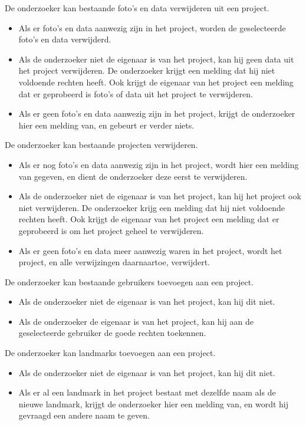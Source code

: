 De onderzoeker kan bestaande foto's en data verwijderen uit een project.
\begin{itemize}
	\item Als er foto's en data aanwezig zijn in het project, worden de geselecteerde foto's en data verwijderd.
	\item Als de onderzoeker niet de eigenaar is van het project, kan hij geen data uit het project verwijderen. De onderzoeker krijgt een melding dat hij niet voldoende rechten heeft. Ook krijgt de eigenaar van het project een melding dat er geprobeerd is foto's of data uit het project te verwijderen.	
	\item Als er geen foto's en data aanwezig zijn in het project, krijgt de onderzoeker hier een melding van, en gebeurt er verder niets.
\end{itemize}

De onderzoeker kan bestaande projecten verwijderen.
\begin{itemize}
	\item Als er nog foto's en data aanwezig zijn in het project, wordt hier een melding van gegeven, en dient de onderzoeker deze eerst te verwijderen.
	\item Als de onderzoeker niet de eigenaar is van het project, kan hij het project ook niet verwijderen. De onderzoeker krijg een melding dat hij niet voldoende rechten heeft. Ook krijgt de eigenaar van het project een melding dat er geprobeerd is om het project geheel te verwijderen.
	\item Als er geen foto's en data meer aanwezig waren in het project, wordt het project, en alle verwijzingen daarnaartoe, verwijdert.
\end{itemize}

De onderzoeker kan bestaande gebruikers toevoegen aan een project.
\begin{itemize}
	\item Als de onderzoeker niet de eigenaar is van het project, kan hij dit niet.
	\item Als de onderzoeker de eigenaar is van het project, kan hij aan de geselecteerde gebruiker de goede rechten toekennen.
\end{itemize}

De onderzoeker kan landmarks toevoegen aan een project.
\begin{itemize}
	\item Als de onderzoeker niet de eigenaar is van het project, kan hij dit niet.
	\item Als er al een landmark in het project bestaat met dezelfde naam als de nieuwe landmark, krijgt de onderzoeker hier een melding van, en wordt hij gevraagd een andere naam te geven.
\end{itemize}


